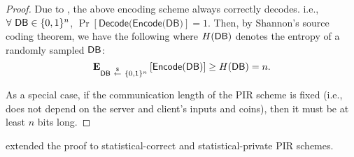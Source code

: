 \begin{proof}
Due to , the above encoding scheme always 
correctly decodes. 
i.e., $\forall~{\sf DB}\in \{0,1\}^n$, $\Pr[\textsf{Decode}(\textsf{Encode(DB)}]=1$. 
Then, by Shannon's source coding theorem, we have the following where 
$H({\sf DB})$ denotes the entropy of a randomly sampled ${\sf DB}$:
\[
    {\bf E}_{{\sf DB}~{\overset{\$}{\leftarrow}}~\{0,1\}^n}\left[\textsf{Encode}({\sf DB})\right]\ge H({\sf DB}) = n.
\]

As a special case, if the communication length of the PIR scheme
is fixed (i.e., does not depend
on the server and client's inputs and coins), 
then it must be at least $n$ bits long.
\end{proof}

\begin{remark}
\cite{DLN19} extended the proof to statistical-correct and statistical-private PIR schemes. 
\end{remark}




